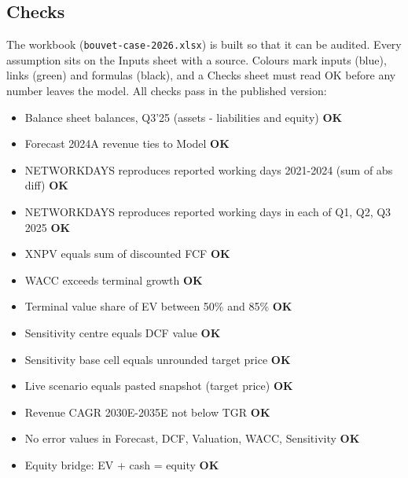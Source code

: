 \documentclass[10pt,a4paper]{article}
\begin{document}
\subsection{Checks}
The workbook (\texttt{bouvet-case-2026.xlsx}) is built so that it can be audited. Every assumption sits on the Inputs sheet with a source. Colours mark inputs (blue), links (green) and formulas (black), and a Checks sheet must read OK before any number leaves the model. All checks pass in the published version:
\begin{itemize}\small
\item Balance sheet balances, Q3'25 (assets - liabilities and equity) \hfill \textbf{OK}
\item Forecast 2024A revenue ties to Model \hfill \textbf{OK}
\item NETWORKDAYS reproduces reported working days 2021-2024 (sum of abs diff) \hfill \textbf{OK}
\item NETWORKDAYS reproduces reported working days in each of Q1, Q2, Q3 2025 \hfill \textbf{OK}
\item XNPV equals sum of discounted FCF \hfill \textbf{OK}
\item WACC exceeds terminal growth \hfill \textbf{OK}
\item Terminal value share of EV between 50\% and 85\% \hfill \textbf{OK}
\item Sensitivity centre equals DCF value \hfill \textbf{OK}
\item Sensitivity base cell equals unrounded target price \hfill \textbf{OK}
\item Live scenario equals pasted snapshot (target price) \hfill \textbf{OK}
\item Revenue CAGR 2030E-2035E not below TGR \hfill \textbf{OK}
\item No error values in Forecast, DCF, Valuation, WACC, Sensitivity \hfill \textbf{OK}
\item Equity bridge: EV + cash = equity \hfill \textbf{OK}
\end{itemize}

\end{document}
